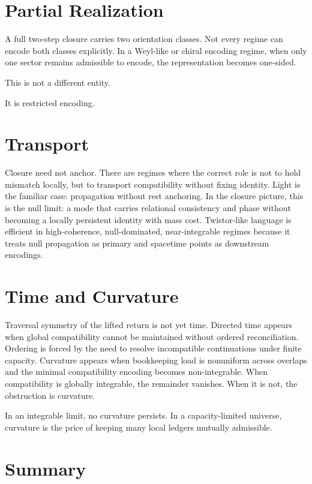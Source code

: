 \documentclass[11pt,twoside,openright]{book}
\begin{document}
\section*{Partial Realization}

A full two-step closure carries two orientation classes. Not every regime can encode both classes explicitly. In a Weyl-like or chiral encoding regime, when only one sector remains admissible to encode, the representation becomes one-sided.

This is not a different entity.

It is restricted encoding.

\section*{Transport}

Closure need not anchor. There are regimes where the correct role is not to hold mismatch locally, but to transport compatibility without fixing identity. Light is the familiar case: propagation without rest anchoring. In the closure picture, this is the null limit: a mode that carries relational consistency and phase without becoming a locally persistent identity with mass cost. Twistor-like language is efficient in high-coherence, null-dominated, near-integrable regimes because it treats null propagation as primary and spacetime points as downstream encodings.

\section*{Time and Curvature}

Traversal symmetry of the lifted return is not yet time. Directed time appears when global compatibility cannot be maintained without ordered reconciliation. Ordering is forced by the need to resolve incompatible continuations under finite capacity. Curvature appears when bookkeeping load is nonuniform across overlaps and the minimal compatibility encoding becomes non-integrable. When compatibility is globally integrable, the remainder vanishes. When it is not, the obstruction is curvature.

In an integrable limit, no curvature persists. In a capacity-limited universe, curvature is the price of keeping many local ledgers mutually admissible.

\section*{Summary}
\end{document}
